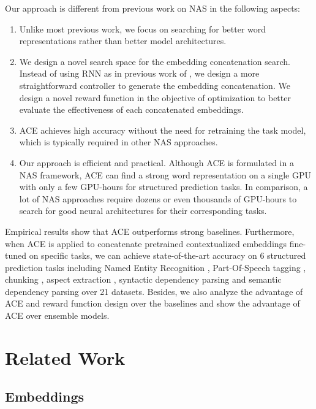 \documentclass[11pt,a4paper]{article}
\begin{document}
Our approach is different from previous work on NAS in the following aspects:
\begin{enumerate}[leftmargin=*]
	\item Unlike most previous work, we focus on searching for better word representations rather than better model architectures.
    \item We design a novel search space for the embedding concatenation search. Instead of using RNN as in previous work of \citet{zoph2016neural}, we design a more straightforward controller to generate the embedding concatenation. We design a novel reward function in the objective of optimization to better evaluate the effectiveness of each concatenated embeddings.
    \item ACE achieves high accuracy without the need for retraining the task model, which is typically required in other NAS approaches.
    \item Our approach is efficient and practical. Although ACE is formulated in a NAS framework, ACE can find a strong word representation on a single GPU with only a few GPU-hours for structured prediction tasks. In comparison, a lot of NAS approaches require dozens or even thousands of GPU-hours to search for good neural architectures for their corresponding tasks.
\end{enumerate}

Empirical results show that ACE outperforms strong baselines. 
Furthermore, when ACE is applied to concatenate pretrained contextualized embeddings fine-tuned on specific tasks, we can achieve
state-of-the-art accuracy on 6 structured prediction tasks including Named Entity Recognition \citep{Sundheim1995NamedET}, Part-Of-Speech tagging \citep{derose-1988-grammatical}, chunking \citep{tjong-kim-sang-buchholz-2000-introduction}, aspect extraction \citep{10.1145/1014052.1014073}, syntactic dependency parsing \citep{arrive1969elements} and semantic dependency parsing \citep{oepensemeval} over 21 datasets.
Besides, we also analyze the advantage of ACE and reward function design over the baselines and show the advantage of ACE over ensemble models. 

\section{Related Work}
\subsection{Embeddings}
\end{document}

